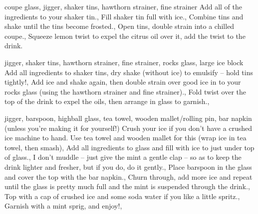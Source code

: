 %
{coupe glass, jigger, shaker tins, hawthorn strainer, fine strainer}
%
{Add all of the ingredients to your shaker tin.,
    Fill shaker tin full with ice.,
    Combine tins and shake until the tins become frosted.,
    Open tins, double strain into a chilled coupe.,
Squeeze lemon twist to expel the citrus oil over it, add the twist to the drink.}

%
{jigger, shaker tins, hawthorn strainer, fine strainer, rocks glass, large ice block}
%
{
    Add all ingredients to shaker tins, dry shake (without ice) to emulsify – hold tins
    tightly!,
    Add ice and shake again, then double strain over good ice in to your rocks glass
    (using the hawthorn strainer and fine strainer).,
    Fold twist over the top of the drink to expel the oils, then arrange in glass to
    garnish.,
}




%
{jigger, barspoon, highball glass, tea towel, wooden mallet/rolling pin, bar
napkin (unless you’re making it for yourself!)}
%
{
    {Crush your ice if you don’t have a crushed ice machine to hand. Use tea towel and
    wooden mallet for this (wrap ice in tea towel, then smash)},
    Add all ingredients to glass and fill with ice to just under top of glass.,
    {    I don’t muddle – just give the mint a gentle clap – so as to keep the drink
    lighter and fresher, but if you do, do it gently.},
    Place barspoon in the glass and cover the top with the bar napkin.,
    Churn through, add more ice and repeat until the glass is pretty much full and the mint is suspended through the drink.,
    Top with a cap of crushed ice and some soda water if you like a little spritz.,
    {Garnish with a mint sprig, and enjoy!},
}



